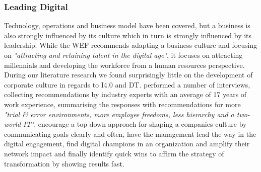 
\subsubsection{Leading Digital}

Technology, operations and business model have been covered, but a business is also strongly influenced by its culture which in turn is strongly influenced by its leadership. While the \ac{WEF} recommends adapting a business culture and focusing on \emph{"attracting and retaining talent in the digital age"}\cite{worldforumdigitalenterprise:2016}, it focuses on attracting millennials and developing the workforce from a human resources perspective. During our literature research we found surprisingly little on the development of corporate culture in regards to \ac{I4.0} and \ac{DT}. \citeauthor{hammer:2015} performed a number of interviews, collecting recommendations by industry experts with an average of 17 years of work experience, summarising the responses with recommendations for more \emph{"trial \& error environments, more employee freedoms, less hierarchy and a two-world IT"}. \citeauthor{bonnect2014leading} encourage a top down approach for shaping a companies culture by communicating goals clearly and often, have the management lead the way in the digital engagement, find digital champions in an organization and amplify their network impact and finally identify quick wins to affirm the strategy of transformation by showing results fast. 




